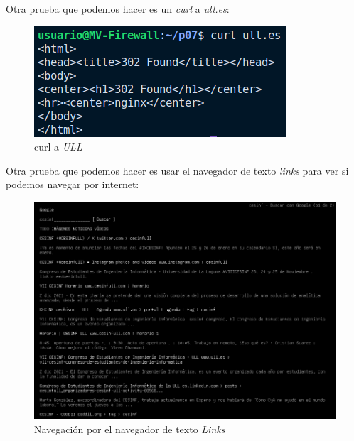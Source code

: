 \documentclass{report}
\begin{document}
\cleardoublepage

Otra prueba que podemos hacer es un \emph{curl} a \emph{ull.es}:

\begin{figure}[H]
  \centering
  \includegraphics[scale=0.8]{img/curl_ull.png}
  \caption{curl a \emph{ULL}}
  \label{fig:curl ULL}
\end{figure}

Otra prueba que podemos hacer es usar el navegador de texto \emph{links} para ver si podemos navegar por internet:
\begin{figure}[H]
  \centering
  \includegraphics[scale=0.65]{img/links_cesinf.png}
  \caption{Navegación por el navegador de texto \emph{Links}}
  \label{fig:links cesinf}
\end{figure}
\end{document}
